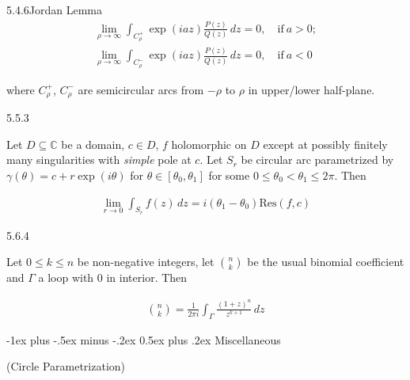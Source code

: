 \documentclass[10pt,landscape]{article}
\makeatletter
\renewcommand{\leq}{\leqslant}
\renewcommand{\section}{\@startsection{section}{1}{0mm}%
                                {-1ex plus -.5ex minus -.2ex}%
                                {0.5ex plus .2ex}%
                                {\normalfont\large\bfseries}}
\makeatother
\begin{document}
\begin{multicols}{3}
\begin{lemma}{5.4.6}{Jordan Lemma}
        \begin{align*}
            \lim_{\rho \to \infty} \int_{C_{\rho}^+} \exp(iaz)\frac{P(z)}{Q(z)} \,dz = 0, \quad \textrm{if}\ a>0; \\
            \lim_{\rho \to \infty} \int_{C_{\rho}^-} \exp(iaz)\frac{P(z)}{Q(z)} \,dz = 0, \quad \textrm{if}\ a<0
        \end{align*}

    where $C_{\rho}^+$, $C_{\rho}^-$ are semicircular arcs from $-\rho$ to $\rho$ in upper/lower half-plane.

\end{lemma}

\begin{lemma}{5.5.3}{}

    Let $D \subseteq \mathbb{C}$ be a domain, $c \in D$, $f$ holomorphic on $D$ except at possibly finitely many singularities with \emph{simple} pole at $c$. Let $S_r$ be circular arc parametrized by $\gamma(\theta) = c + r \exp(i\theta)$ for $\theta \in [\theta_0,\theta_1]$ for some $0 \leq \theta_0 < \theta_1 \leq 2\pi$. Then

        \begin{align*}
            \lim_{r \to 0} \int_{S_r} f(z) \,dz = i(\theta_1 - \theta_0)\mathrm{Res}(f,c)
        \end{align*}

\end{lemma}

%
\begin{lemma}{5.6.4}{}

    Let $0 \leq k \leq n$ be non-negative integers, let $\binom{n}{k}$ be the usual binomial coefficient and $\Gamma$ a loop with $0$ in interior. Then

        \begin{align*}
            \binom{n}{k} = \frac{1}{2\pi i} \int_{\Gamma} \frac{(1+z)^n}{z^{k+1}} \, dz
        \end{align*}

\end{lemma}


\section{Miscellaneous}

\begin{example}{(Circle Parametrization)}{}


\end{example}
\end{multicols}
\end{document}
